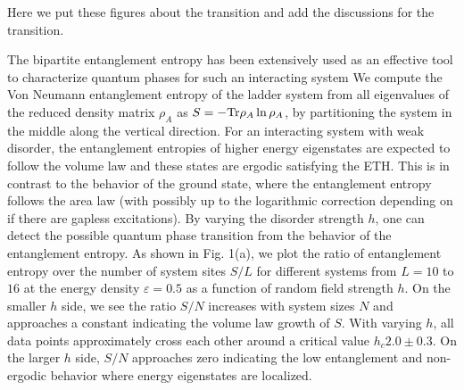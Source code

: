\documentclass[prl,aps,epsf,showpacs,twocolumn]{revtex4}
\begin{document}
Here we put these figures about the transition and  add the discussions  for the transition.


The bipartite entanglement entropy has been extensively used as an effective tool  to
characterize  quantum phases for such an  interacting system\cite{nandkishore2015, luitz2015, kjall2014}
 We compute the Von Neumann entanglement entropy of the ladder system  from all eigenvalues of the reduced density matrix
$\rho_A$ as
 $S=- {\rm Tr} \rho_A \ln \rho_A$,
 by partitioning the system in  the middle
along the vertical direction.
For an interacting  system with weak disorder,
the entanglement entropies of   higher energy eigenstates are  expected to follow the
 volume law and these states are ergodic satisfying  the ETH\cite{nandkishore2015,altman2015}.
This is in contrast to the behavior of the  ground state,  where
 the entanglement entropy follows the area law (with possibly up to the logarithmic correction
depending on if there are gapless excitations)\cite{grover2014}.
By varying the disorder strength  $h$,  one can detect the possible quantum phase transition from the  behavior of the
entanglement entropy\cite{kjall2014, luitz2015}.
As shown in  Fig. 1(a), we plot the  ratio of  entanglement entropy over the number of system sites  $S/L$
for  different systems  from
$L=10$ to $16$  at the energy density $\varepsilon =0.5$ as
a function of random field strength $h$.
On the  smaller $h$ side, we see the ratio $S/N$ increases with  system sizes $N$ and  approaches a constant  indicating the volume law growth of  $S$.
With varying $h$,  all data points approximately cross each other around  a critical value  $h_c 2.0\pm 0.3$.
On the  larger $h$ side,  $S/N$ approaches zero
indicating the low entanglement and non-ergodic behavior  where  energy eigenstates are localized.
\end{document}
